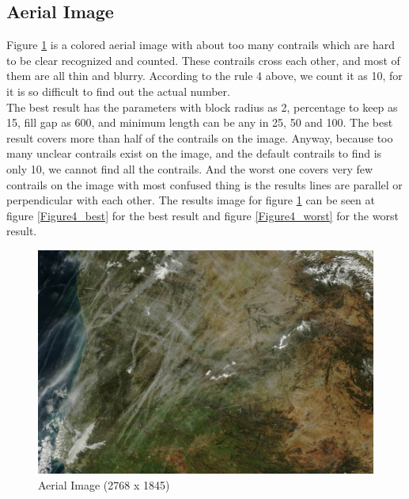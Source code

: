 \clearpage
\subsection{Aerial Image}

Figure \ref{figure4} is a colored aerial image with about too many contrails which are hard to be clear recognized and counted. These contrails cross each other, and most of them are all thin and blurry. According to the rule 4 above, we count it as 10, for it is so difficult to find out the actual number. \\
The best result has the parameters with block radius as 2, percentage to keep as 15, fill gap as 600, and minimum length can be any in 25, 50 and 100. The best result covers more than half of the contrails on the image. Anyway, because too many unclear contrails exist on the image, and the default contrails to find is only 10, we cannot find all the contrails. And the worst one covers very few contrails on the image with most confused thing is the results lines are parallel or perpendicular with each other. The results image for figure \ref{figure4} can be seen at figure \ref{Figure4_best} for the best result and figure \ref{Figure4_worst} for the worst result.

\begin{figure}[htb!]
\centering
\includegraphics[width=6in]{pic/figure4.jpg}
\caption{Aerial Image (2768 x 1845)}
\label{figure4}
\end{figure}

